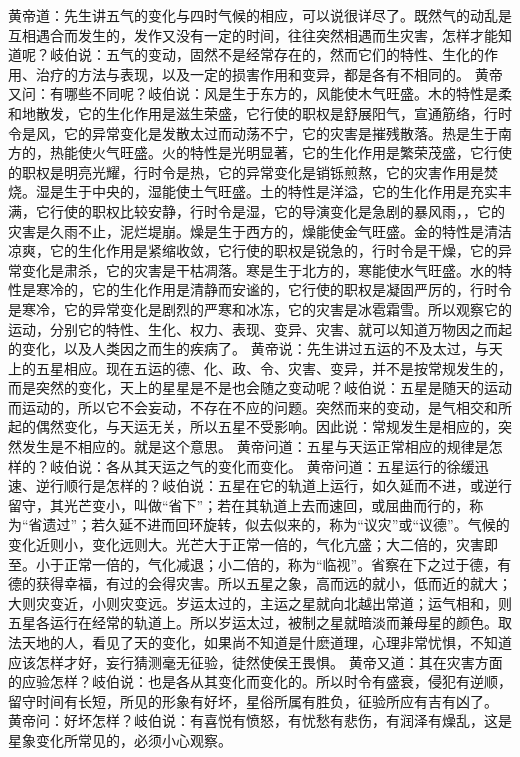 \documentclass[a4paper,12pt,UTF8,twoside]{ctexbook}
\begin{document}
黄帝道：先生讲五气的变化与四时气候的相应，可以说很详尽了。既然气的动乱是互相遇合而发生的，发作又没有一定的时间，往往突然相遇而生灾害，怎样才能知道呢？岐伯说：五气的变动，固然不是经常存在的，然而它们的特性、生化的作用、治疗的方法与表现，以及一定的损害作用和变异，都是各有不相同的。
黄帝又问：有哪些不同呢？岐伯说：风是生于东方的，风能使木气旺盛。木的特性是柔和地散发，它的生化作用是滋生荣盛，它行使的职权是舒展阳气，宣通筋络，行时令是风，它的异常变化是发散太过而动荡不宁，它的灾害是摧残散落。热是生于南方的，热能使火气旺盛。火的特性是光明显著，它的生化作用是繁荣茂盛，它行使的职权是明亮光耀，行时令是热，它的异常变化是销铄煎熬，它的灾害作用是焚烧。湿是生于中央的，湿能使土气旺盛。土的特性是洋溢，它的生化作用是充实丰满，它行使的职权比较安静，行时令是湿，它的导演变化是急剧的暴风雨，，它的灾害是久雨不止，泥烂堤崩。燥是生于西方的，燥能使金气旺盛。金的特性是清洁凉爽，它的生化作用是紧缩收敛，它行使的职权是锐急的，行时令是干燥，它的异常变化是肃杀，它的灾害是干枯凋落。寒是生于北方的，寒能使水气旺盛。水的特性是寒冷的，它的生化作用是清静而安谧的，它行使的职权是凝固严厉的，行时令是寒冷，它的异常变化是剧烈的严寒和冰冻，它的灾害是冰雹霜雪。所以观察它的运动，分别它的特性、生化、权力、表现、变异、灾害、就可以知道万物因之而起的变化，以及人类因之而生的疾病了。
黄帝说：先生讲过五运的不及太过，与天上的五星相应。现在五运的德、化、政、令、灾害、变异，并不是按常规发生的，而是突然的变化，天上的星星是不是也会随之变动呢？岐伯说：五星是随天的运动而运动的，所以它不会妄动，不存在不应的问题。突然而来的变动，是气相交和所起的偶然变化，与天运无关，所以五星不受影响。因此说：常规发生是相应的，突然发生是不相应的。就是这个意思。
黄帝问道：五星与天运正常相应的规律是怎样的？岐伯说：各从其天运之气的变化而变化。
黄帝问道：五星运行的徐缓迅速、逆行顺行是怎样的？岐伯说：五星在它的轨道上运行，如久延而不进，或逆行留守，其光芒变小，叫做“省下”；若在其轨道上去而速回，或屈曲而行的，称为“省遗过”；若久延不进而回环旋转，似去似来的，称为“议灾”或“议德”。气候的变化近则小，变化远则大。光芒大于正常一倍的，气化亢盛；大二倍的，灾害即至。小于正常一倍的，气化减退；小二倍的，称为“临视”。省察在下之过于德，有德的获得幸福，有过的会得灾害。所以五星之象，高而远的就小，低而近的就大；大则灾变近，小则灾变远。岁运太过的，主运之星就向北越出常道；运气相和，则五星各运行在经常的轨道上。所以岁运太过，被制之星就暗淡而兼母星的颜色。取法天地的人，看见了天的变化，如果尚不知道是什麽道理，心理非常忧惧，不知道应该怎样才好，妄行猜测毫无征验，徒然使侯王畏惧。
黄帝又道：其在灾害方面的应验怎样？岐伯说：也是各从其变化而变化的。所以时令有盛衰，侵犯有逆顺，留守时间有长短，所见的形象有好坏，星俗所属有胜负，征验所应有吉有凶了。
黄帝问：好坏怎样？岐伯说：有喜悦有愤怒，有忧愁有悲伤，有润泽有燥乱，这是星象变化所常见的，必须小心观察。
\end{document}
